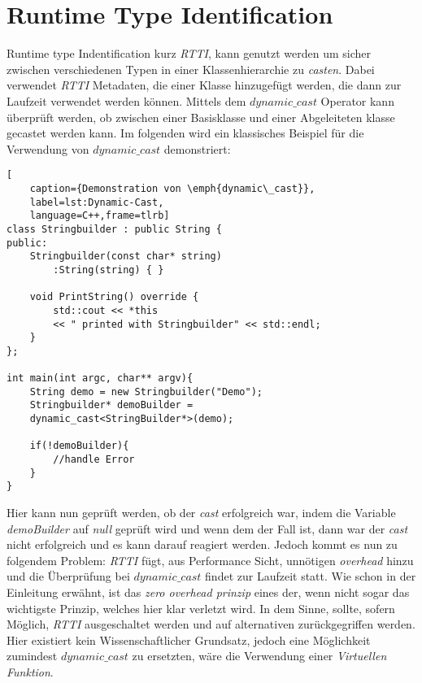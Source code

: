 \section{Runtime Type Identification}\label{sec:rtti}
Runtime type Indentification kurz \emph{RTTI}, kann genutzt werden um sicher zwischen
verschiedenen Typen in einer Klassenhierarchie zu \emph{casten}. Dabei verwendet \emph{RTTI}
Metadaten, die einer Klasse hinzugefügt werden, die dann zur Laufzeit verwendet werden können.
Mittels dem \emph{$dynamic\_cast$} Operator kann überprüft werden, ob zwischen einer Basisklasse
und einer Abgeleiteten klasse gecastet werden kann. Im folgenden wird ein klassisches Beispiel
für die Verwendung von \emph{$dynamic\_cast$} demonstriert:
\begin{lstlisting}[
    caption={Demonstration von \emph{dynamic\_cast}},
    label=lst:Dynamic-Cast,
    language=C++,frame=tlrb]
class Stringbuilder : public String {
public:
	Stringbuilder(const char* string)
		:String(string) { }

    void PrintString() override {
    	std::cout << *this
       	<< " printed with Stringbuilder" << std::endl;
    }
};

int main(int argc, char** argv){
	String demo = new Stringbuilder("Demo");
	Stringbuilder* demoBuilder =
	dynamic_cast<StringBuilder*>(demo);

	if(!demoBuilder){
		//handle Error
	}
}
\end{lstlisting}

Hier kann nun geprüft werden, ob der \emph{cast} erfolgreich war, indem die Variable
\emph{demoBuilder} auf \emph{null} geprüft wird und wenn dem der Fall ist, dann war der
\emph{cast} nicht erfolgreich und es kann darauf reagiert werden.
\newline
\newline
Jedoch kommt es nun zu folgendem Problem: \emph{RTTI} fügt, aus Performance Sicht, unnötigen
\emph{overhead} hinzu und die Überprüfung bei \emph{$dynamic\_cast$} findet zur Laufzeit statt.
Wie schon in der Einleitung erwähnt, ist das \emph{zero overhead prinzip} eines der, wenn nicht
sogar das wichtigste Prinzip, welches hier klar verletzt wird. In dem Sinne, sollte, sofern
Möglich, \emph{RTTI} ausgeschaltet werden und auf alternativen zurückgegriffen werden. Hier
existiert kein Wissenschaftlicher Grundsatz, jedoch eine Möglichkeit zumindest
\emph{$dynamic\_cast$} zu ersetzten, wäre die Verwendung einer \emph{Virtuellen Funktion}.